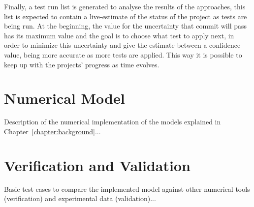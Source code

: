 Finally, a test run list is generated to analyse the results of the approaches, this list is expected to contain a live-estimate of the status of the project as tests are being run. At the beginning, the value for the uncertainty that commit will pass has its maximum value and the goal is to choose what test to apply next, in order to minimize this uncertainty and give the estimate between a confidence value, being more accurate as more tests are applied. This way it is possible to keep up with the projects' progress as time evolves.

\section{Numerical Model}
\label{section:model}

Description of the numerical implementation of the models explained in Chapter~\ref{chapter:background}...


\section{Verification and Validation}
\label{section:verification}

Basic test cases to compare the implemented model against other numerical tools (verification) and experimental data (validation)...

